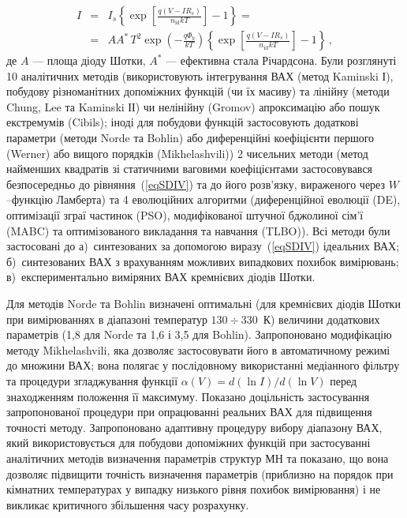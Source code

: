 \documentclass[a5paper,10pt,twoside,openany,article]{memoir} %
\begin{document}
\begin{eqnarray}
\label{eqSDIV}
\nonumber I&=&I_s\left\{\exp\left[\frac{q(V-IR_s)}{n_\mathrm{id}kT}\right]-1\right\}=\\
&=&AA^*\,T^2\exp\left(-\frac{q\Phi_b}{kT}\right)\left\{\exp\left[\frac{q(V-IR_s)}{n_\mathrm{id}kT}\right]-1\right\}\,,
\end{eqnarray}
де
$A$ --- площа діоду Шотки,
$A^*$ --- ефективна стала Річардсона.
Були розглянуті 10 аналітичних методів (використовують інтегрування ВАХ (метод Kaminski І), побудову різноманітних допоміжних функцій (чи їх масиву) та лінійну (методи Chung, Lee та Kaminski ІІ) чи нелінійну (Gromov) апроксимацію або пошук екстремумів (Cibils);
іноді для побудови функцій застосовують додаткові параметри (методи Norde та Bohlin) або диференційні коефіцієнти першого (Werner) або вищого порядків (Mikhelashvili))
2 чисельних методи (метод найменших квадратів зі статичними ваговими коефіцієнтами застосовувався безпосередньо до рівняння~(\ref{eqSDIV}) та до його розв'язку, вираженого через $W$--функцію Ламберта) та
4 еволюційних алгоритми (диференційної еволюції (DE),
оптимізації зграї частинок (PSO),
модифікованої штучної бджолиної сім'ї (MABC) та
оптимізованого викладання та навчання (TLBO)).
Всі методи були застосовані до
а)~синтезованих за допомогою виразу~(\ref{eqSDIV}) ідеальних ВАХ;
б)~синтезованих ВАХ з врахуванням можливих випадкових похибок вимірювань;
в)~експериментально виміряних ВАХ кремнієвих діодів Шотки.

Для методів Norde та Bohlin визначені  оптимальні (для кремнієвих діодів Шотки при вимірюваннях в діапазоні температур $130\div330$~К) величини додаткових параметрів (1,8 для Norde та 1,6 і 3,5 для Bohlin).
Запропоновано модифікацію методу Mikhelashvili, яка дозволяє застосовувати його в автоматичному режимі до множини ВАХ;
вона полягає у послідовному використанні медіанного фільтру та процедури згладжування функції $\alpha(V)=d(\ln I)/d(\ln V)$ перед знаходженням положення її максимуму.
Показано доцільність застосування запропонованої процедури при опрацюванні реальних ВАХ для підвищення точності методу.
Запропоновано адаптивну процедуру вибору діапазону ВАХ, який використовується для побудови допоміжних функцій при застосуванні аналітичних методів визначення параметрів структур МН та показано, що вона дозволяє підвищити точність визначення параметрів (приблизно на порядок при кімнатних температурах у випадку низького рівня похибок вимірювання) і не викликає критичного збільшення часу розрахунку.
\end{document}
